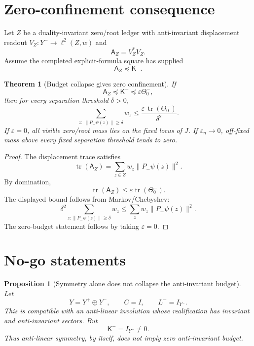 \documentclass[11pt]{article}
\newtheorem{theorem}{Theorem}
\newtheorem{proposition}{Proposition}
\newcommand{\K}{\mathsf K}
\newcommand{\A}{\mathsf A}
\newcommand{\Tr}{\operatorname{tr}}
\newcommand{\pre}{\preceq}
\begin{document}
\section{Zero-confinement consequence}

Let \(Z\) be a duality-invariant zero/root ledger with anti-invariant displacement readout \(V_Z:Y^-\to \ell^2(Z,w)\) and
\begin{equation}
\A_Z=V_Z^*V_Z.
\end{equation}
Assume the completed explicit-formula square has supplied
\begin{equation}
  \A_Z\pre\K^- .
\end{equation}

\begin{theorem}[Budget collapse gives zero confinement]
If
\begin{equation}
  \A_Z\pre \K^-\pre \varepsilon \Theta_0^- ,
\end{equation}
then for every separation threshold \(\delta>0\),
\begin{equation}
\boxed{
  \sum_{z:\ \|P_-\psi(z)\|\ge \delta} w_z
  \le
  \frac{\varepsilon\,\Tr(\Theta_0^-)}{\delta^2} .
}
\end{equation}
If \(\varepsilon=0\), all visible zero/root mass lies on the fixed locus of \(J\). If \(\varepsilon_n\to0\), off-fixed mass above every fixed separation threshold tends to zero.
\end{theorem}

\begin{proof}
The displacement trace satisfies
\begin{equation}
  \Tr(\A_Z)=\sum_{z\in Z}w_z\|P_-\psi(z)\|^2.
\end{equation}
By domination,
\begin{equation}
  \Tr(\A_Z)\le \varepsilon \Tr(\Theta_0^-).
\end{equation}
The displayed bound follows from Markov/Chebyshev:
\begin{equation}
  \delta^2 \sum_{z:\|P_-\psi(z)\|\ge\delta} w_z
  \le \sum_z w_z\|P_-\psi(z)\|^2.
\end{equation}
The zero-budget statement follows by taking \(\varepsilon=0\).\end{proof}

\section{No-go statements}

\begin{proposition}[Symmetry alone does not collapse the anti-invariant budget]
Let
\begin{equation}
Y=Y^+\oplus Y^- ,
\qquad
C=I,
\qquad
L^-=I_{Y^-}.
\end{equation}
This is compatible with an anti-linear involution whose realification has invariant and anti-invariant sectors. But
\begin{equation}
\K^-=I_{Y^-}\ne0.
\end{equation}
Thus anti-linear symmetry, by itself, does not imply zero anti-invariant budget.
\end{proposition}
\end{document}
